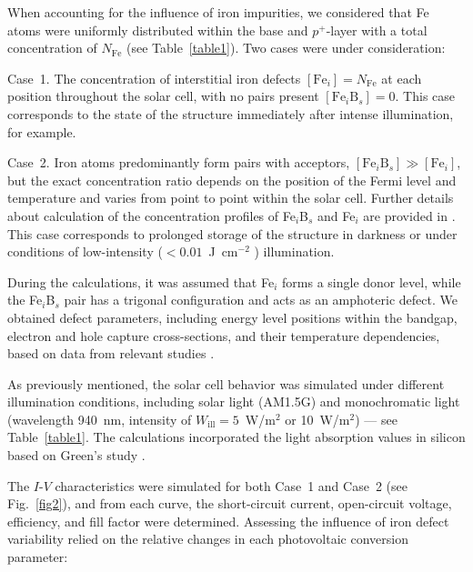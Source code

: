 \documentclass[a4paper,fleqn]{cas-sc}
\begin{document}
When accounting for the influence of iron impurities,
we considered that Fe atoms were uniformly distributed within the base and $p^+$-layer
with a total concentration of $N_\mathrm{Fe}$ (see Table~\ref{table1}).
Two cases were under consideration:

Case~1.
The concentration of interstitial iron defects $\left[\mathrm{Fe}_i\right]=N_\mathrm{Fe}$  at each position throughout the solar cell,
with no pairs present $\left[\mathrm{Fe}_i\mathrm{B}_s\right]=0$.
This case corresponds to the state of the structure immediately after intense illumination, for example.

Case~2.
Iron atoms predominantly form pairs with acceptors, $\left[\mathrm{Fe}_i\mathrm{B}_s\right] \gg \left[\mathrm{Fe}_i\right]$,
but the exact concentration ratio depends on the position of the Fermi level and temperature \cite{FeB:kinetic,MurphyJAP2011}
and varies from point to point within the solar cell.
Further details about calculation of the concentration profiles of Fe$_i$B$_s$ and Fe$_i$ are provided in \cite{Olikh2022PPV,Olikh2019SM}.
This case corresponds to prolonged storage of the structure in darkness or under conditions of low-intensity ($< 0.01$~J~cm$^{-2}$ \cite{Macdonald2004}) illumination.


During the calculations, it was assumed that Fe$_i$ forms a single donor level,
while the Fe$_i$B$_s$ pair has a trigonal configuration and acts as an amphoteric defect.
We obtained defect parameters, including energy level positions within the bandgap, electron and hole capture cross-sections, and their temperature dependencies, based on data from relevant studies \cite{ROUGIEUX2018,Istratov1999,Paudyal}.

As previously mentioned, the solar cell behavior was simulated under different illumination conditions,
including solar light (AM1.5G) and monochromatic light (wavelength 940~nm, intensity of $W_\mathrm{ill} = 5$~W/m$^{2}$ or 10~W/m$^{2}$) --- see Table~\ref{table1}.
The calculations incorporated the light absorption values in silicon based on Green's study \cite{Green2022}.


The $I$-$V$ characteristics were simulated for both Case~1 and Case~2 (see Fig.~\ref{fig2}),
and from each curve, the short-circuit current, open-circuit voltage, efficiency, and fill factor were determined.
Assessing the influence of iron defect variability relied on the relative changes in each photovoltaic conversion parameter:
\end{document}
